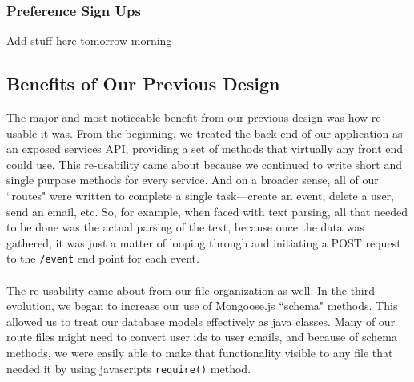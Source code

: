 \documentclass[11pt]{article}   %
\begin{document}
\subsubsection*{Preference Sign Ups}
Add stuff here tomorrow morning

\subsection{Benefits of Our Previous Design}
The major and most noticeable benefit from our previous design was how re-usable it was. From the beginning, we treated the back end of our application as an exposed services API, providing a set of methods that virtually any front end could use. This re-usability came about because we continued to write short and single purpose methods for every service. And on a broader sense, all of our ``routes" were written to complete a single task---create an event, delete a user, send an email, etc. So, for example, when faced with text parsing, all that needed to be done was the actual parsing of the text, because once the data was gathered, it was just a matter of looping through and initiating a POST request to the \texttt{/event} end point for each event. \\~\\
The re-usability came about from our file organization as well. In the third evolution, we began to increase our use of Mongoose.js ``schema" methods. This allowed us to treat our database models effectively as java classes. Many of our route files might need to convert user ids to user emails, and because of schema methods, we were easily able to make that functionality visible to any file that needed it by using javascripts \texttt{require()} method.
\end{document}
